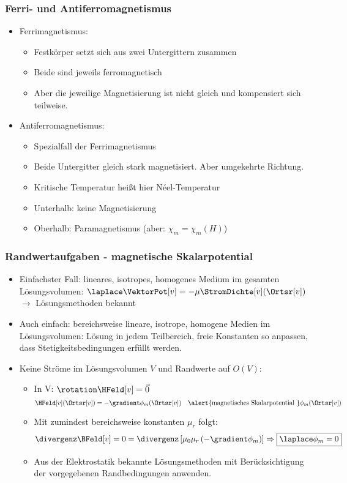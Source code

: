 \begin{frame}
  \frametitle{Ferri- und Antiferromagnetismus}
  \begin{itemize}[<+->]
  \item Ferrimagnetismus:
  \begin{itemize}[<+->]
  \item Festkörper setzt sich aus zwei Untergittern zusammen
  \item Beide sind jeweils ferromagnetisch
    \item Aber die jeweilige Magnetisierung ist nicht gleich und kompensiert sich teilweise.
  \end{itemize}
  \item Antiferromagnetismus:
  \begin{itemize}[<+->]
  \item Spezialfall der Ferrimagnetismus
  \item Beide Untergitter gleich stark magnetisiert. Aber umgekehrte Richtung.
  \item Kritische Temperatur heißt hier \alert{N{\'e}el-Temperatur}
  \item Unterhalb: keine Magnetisierung
    \item Oberhalb: Paramagnetismus (aber: $\chi_m=\chi_m(H)$) 
  \end{itemize}
\end{itemize}
\end{frame}



\begin{frame}
  \frametitle{Randwertaufgaben - magnetische Skalarpotential}
  \begin{itemize}[<+->]
  \item Einfachster Fall: lineares, isotropes, homogenes Medium im \alert{gesamten} Lösungsvolumen: $\laplace \VektorPot[v]= -\mu \StromDichte[v](\Ortsr[v])$ $\to$ Lösungsmethoden bekannt
  \item Auch einfach: \alert{bereichsweise} lineare, isotrope, homogene Medien im Lösungsvolumen: Lösung in jedem Teilbereich, freie Konstanten so anpassen, dass Stetigkeitsbedingungen erfüllt werden.
  \item Keine Ströme im Lösungsvolumen $V$ und Randwerte auf $O(V)$:
      \begin{itemize}[<+->]
      \item In V: $\rotation\HFeld[v] = \vec{0}$
        $$
        \HFeld[v](\Ortsr[v]) = -\gradient \phi_m (\Ortsr[v]) \quad \text{\alert{magnetisches Skalarpotential }} \phi_m (\Ortsr[v]) 
        $$
      \item Mit zumindest bereichsweise konstanten $\mu_r$ folgt:
        $$
        \divergenz \BFeld[v] = 0 = \divergenz \left[\mu_0\mu_r \left(-\gradient \phi_m \right)\right] \Rightarrow \boxed{\laplace \phi_m = 0}
        $$
        \item Aus der Elektrostatik bekannte Lösungsmethoden mit Berücksichtigung der vorgegebenen Randbedingungen anwenden.
\end{itemize}
\end{itemize}
\end{frame}

